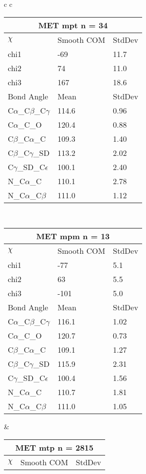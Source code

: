 \begin{longtable}{ c c }
\begin{tabular}{ l l l }
  \toprule
  \multicolumn{3}{c}{MET \textbf{mpt} n = 34} \\ \toprule
  $\chi$       & Smooth COM & StdDev \\ \midrule
  chi1 & -69 & 11.7 \\ 
  chi2 & 74 & 11.0 \\ 
  chi3 & 167 & 18.6 \\ \midrule
  Bond Angle   & Mean     & StdDev \\ \midrule
  C$\alpha$\_C$\beta$\_C$\gamma$ & 114.6 & 0.96\\
  C$\alpha$\_C\_O & 120.4 & 0.88\\
  C$\beta$\_C$\alpha$\_C & 109.3 & 1.40\\
  C$\beta$\_C$\gamma$\_SD & 113.2 & 2.02\\
  C$\gamma$\_SD\_C$\epsilon$ & 100.1 & 2.40\\
  N\_C$\alpha$\_C & 110.1 & 2.78\\
  N\_C$\alpha$\_C$\beta$ & 111.0 & 1.12\\
  \bottomrule
  \end{tabular}
  \\
  \begin{tabular}{ l l l }
  \toprule
  \multicolumn{3}{c}{MET \textbf{mpm} n = 13} \\ \toprule
  $\chi$       & Smooth COM & StdDev \\ \midrule
  chi1 & -77 & 5.1 \\ 
  chi2 & 63 & 5.5 \\ 
  chi3 & -101 & 5.0 \\ \midrule
  Bond Angle   & Mean     & StdDev \\ \midrule
  C$\alpha$\_C$\beta$\_C$\gamma$ & 116.1 & 1.02\\
  C$\alpha$\_C\_O & 120.7 & 0.73\\
  C$\beta$\_C$\alpha$\_C & 109.1 & 1.27\\
  C$\beta$\_C$\gamma$\_SD & 115.9 & 2.31\\
  C$\gamma$\_SD\_C$\epsilon$ & 100.4 & 1.56\\
  N\_C$\alpha$\_C & 110.7 & 1.81\\
  N\_C$\alpha$\_C$\beta$ & 111.0 & 1.05\\
  \bottomrule
  \end{tabular}
  &
  \begin{tabular}{ l l l }
  \toprule
  \multicolumn{3}{c}{MET \textbf{mtp} n = 2815} \\ \toprule
  $\chi$       & Smooth COM & StdDev \\ \midrule

\end{tabular}
\end{longtable}

